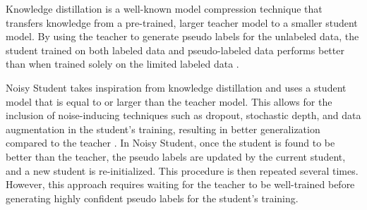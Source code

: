 \documentclass{article}
\begin{document}

Knowledge distillation \cite{GH15a} is a well-known model compression technique that transfers knowledge from a pre-trained, larger teacher model to a smaller student model.
By using the teacher to generate pseudo labels for the unlabeled data, the student trained on both labeled data and pseudo-labeled data performs better than when trained solely on the limited labeled data \cite{GH15a}.

Noisy Student \cite{QX20a} takes inspiration from knowledge distillation and uses a student model that is equal to or larger than the teacher model.
This allows for the inclusion of noise-inducing techniques such as dropout, stochastic depth, and data augmentation in the student's training, resulting in better generalization compared to the teacher \cite{QX20a}.
In Noisy Student, once the student is found to be better than the teacher, the pseudo labels are updated by the current student,
and a new student is re-initialized. This procedure is then repeated several times.
However, this approach requires waiting for the teacher to be well-trained before generating highly confident pseudo labels for the student's training.
\end{document}
